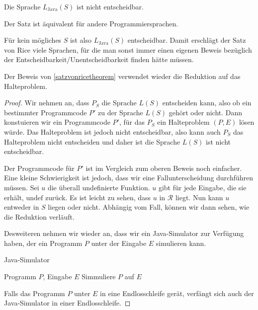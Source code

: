 \documentclass[journal]{IEEEtran}
\begin{document}
\begin{theorem}
\label{satzvonricetheorem}
  Die Sprache $L_\text{Java}(S)$ ist nicht entscheidbar.
\end{theorem}

Der Satz ist äquivalent für andere Programmiersprachen.

Für kein mögliches $S$ ist also $L_\text{Java}(S)$ entscheidbar. Damit erschlägt der Satz von Rice viele Sprachen, für die man sonst immer einen eigenen Beweis bezüglich der Entscheidbarkeit/Unentscheidbarkeit finden hätte müssen.

Der Beweis von \ref{satzvonricetheorem} verwendet wieder die Reduktion auf das Halteproblem.

\begin{proof}

Wir nehmen an, dass $P_S$ die Sprache $L(S)$ entscheiden kann, also ob ein bestimmter Programmcode $P'$ zu der Sprache $L(S)$ gehört oder nicht. Dann konstuieren wir ein Programmcode $P'$, für das $P_S$ ein Halteproblem $(P, E)$ lösen würde. Das Halteproblem ist jedoch nicht entscheidbar, also kann auch $P_S$ das Halteproblem nicht entscheiden und daher ist die Sprache $L(S)$ ist nicht entscheidbar.

Der Programmcode für $P'$ ist im Vergleich zum oberen Beweis noch einfacher. Eine kleine Schwierigkeit ist jedoch, dass wir eine Fallunterscheidung durchführen müssen. Sei $u$ die überall undefinierte Funktion. $u$ gibt für jede Eingabe, die sie erhält, $\mathrm{undef}$ zurück. Es ist leicht zu sehen, dass $u$ in $\mathcal{R}$ liegt. Nun kann $u$ entweder in $S$ liegen oder nicht. Abhängig vom Fall, können wir dann sehen, wie die Reduktion verläuft.

Desweiteren nehmen wir wieder an, dass wir ein Java-Simulator zur Verfügung haben, der ein Programm $P$ unter der Eingabe $E$ simulieren kann.

\begin{algorithm}
\caption{Java-Simulator}
\begin{algorithmic}[1]
\renewcommand{\algorithmicrequire}{\textbf{Input:}}
\renewcommand{\algorithmicensure}{\textbf{Output:}}
\REQUIRE Programm $P$, Eingabe $E$
\STATE Simmuliere $P$ auf $E$
\end{algorithmic}
\end{algorithm}

Falls das Programm $P$ unter $E$ in eine Endlosschleife gerät, verfängt sich auch der Java-Simulator in einer Endlosschleife.


\end{proof}
\end{document}
